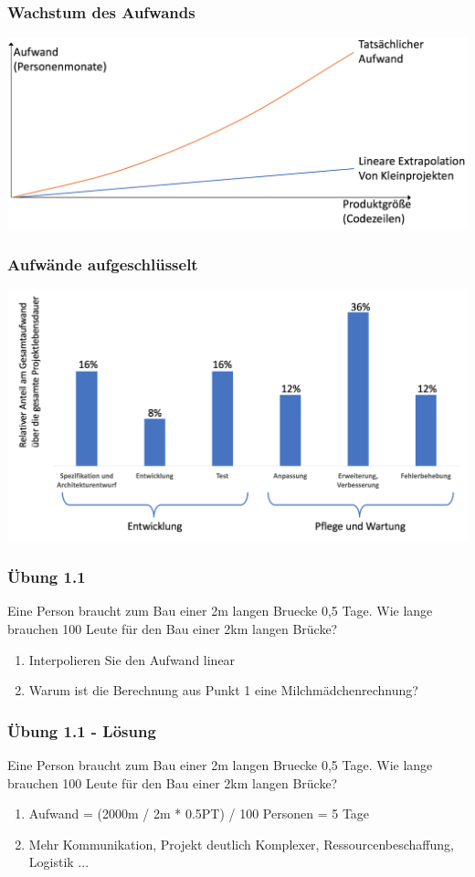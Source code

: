 \begin{frame}
\frametitle{Wachstum des Aufwands}
	\center\includegraphics[width=1\textwidth,
	keepaspectratio=true]{bilder/projektaufwand.png}
\end{frame}

\begin{frame}
\frametitle{Aufwände aufgeschlüsselt}
	\center\includegraphics[width=1\textwidth,
	keepaspectratio=true]{bilder/anteil_aufwand.png}
\end{frame}

\begin{frame}
\frametitle{Übung 1.1}
	Eine Person braucht zum Bau einer 2m langen Bruecke 0,5 Tage. Wie lange brauchen 100 Leute für den Bau einer 2km langen Brücke?
	\begin{enumerate}
		\item Interpolieren Sie den Aufwand linear
		\item Warum ist die Berechnung aus Punkt 1 eine Milchmädchenrechnung?
	\end{enumerate}
\end{frame}

\begin{frame}
\frametitle{Übung 1.1 - Lösung}
	Eine Person braucht zum Bau einer 2m langen Bruecke 0,5 Tage. Wie lange brauchen 100 Leute für den Bau einer 2km langen Brücke?
	\begin{enumerate}
		\item Aufwand = (2000m / 2m * 0.5PT) / 100 Personen = 5 Tage
		\item Mehr Kommunikation, Projekt deutlich Komplexer, Ressourcenbeschaffung, Logistik ...
	\end{enumerate}
\end{frame}


